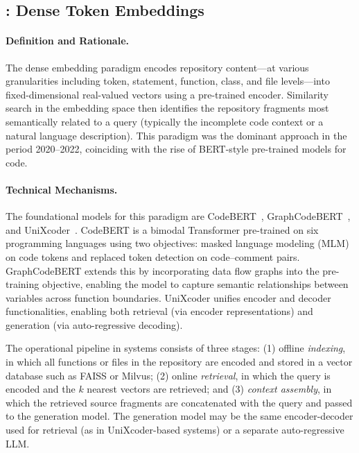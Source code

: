 \subsection{: Dense Token Embeddings}
\label{subsec:par1}

\paragraph{Definition and Rationale.}
The dense embedding paradigm encodes repository content---at various granularities including
token, statement, function, class, and file levels---into fixed-dimensional real-valued vectors
using a pre-trained encoder. Similarity search in the embedding space then identifies the
repository fragments most semantically related to a query (typically the incomplete code context
or a natural language description). This paradigm was the dominant approach in the period
2020--2022, coinciding with the rise of BERT-style pre-trained models for code.

\paragraph{Technical Mechanisms.}
The foundational models for this paradigm are CodeBERT~\cite{feng2020codebert},
GraphCodeBERT~\cite{guo2021graphcodebert}, and UniXcoder~\cite{guo2022unixcoder}.
CodeBERT is a bimodal Transformer pre-trained on six programming languages using two objectives:
masked language modeling (MLM) on code tokens and replaced token detection on code--comment
pairs. GraphCodeBERT extends this by incorporating data flow graphs into the pre-training
objective, enabling the model to capture semantic relationships between variables across
function boundaries. UniXcoder unifies encoder and decoder functionalities, enabling both
retrieval (via encoder representations) and generation (via auto-regressive decoding).

The operational pipeline in  systems consists of three stages: (1) offline
\emph{indexing}, in which all functions or files in the repository are encoded and stored in a
vector database such as FAISS or Milvus; (2) online \emph{retrieval}, in which the query is
encoded and the $k$ nearest vectors are retrieved; and (3) \emph{context assembly}, in which
the retrieved source fragments are concatenated with the query and passed to the generation
model. The generation model may be the same encoder-decoder used for retrieval
(as in UniXcoder-based systems) or a separate auto-regressive LLM.


